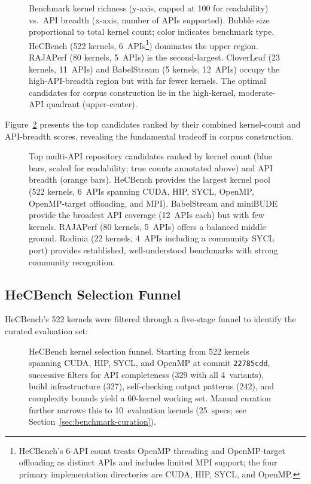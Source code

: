 \begin{figure}[htbp]
    \centering
    
    \caption{Benchmark kernel richness (y-axis, capped at 100 for readability) vs.\
    API breadth (x-axis, number of APIs supported). Bubble size proportional to total kernel count; color indicates benchmark type. HeCBench (522 kernels, 6~APIs\protect\footnote{HeCBench's 6-API count treats OpenMP threading and OpenMP-target offloading as distinct APIs and includes limited MPI support; the four primary implementation directories are CUDA, HIP, SYCL, and OpenMP.}) dominates the upper region. RAJAPerf (80 kernels, 5~APIs) is the second-largest. CloverLeaf (23 kernels, 11~APIs) and BabelStream (5 kernels, 12~APIs) occupy the high-API-breadth region but with far fewer kernels. The optimal candidates for corpus construction lie in the high-kernel, moderate-API quadrant (upper-center).}
  \label{fig:kernel-api-bubble}
\end{figure}

Figure~\ref{fig:top-candidates} presents the top candidates ranked by their combined kernel-count and API-breadth scores, revealing the fundamental tradeoff in corpus construction.

\begin{figure}[htbp]
    \centering
    
    \caption{Top multi-API repository candidates ranked by kernel count (blue bars, scaled for readability; true counts annotated above) and API breadth (orange bars). HeCBench provides the largest kernel pool (522 kernels, 6~APIs spanning CUDA, HIP, SYCL, OpenMP, OpenMP-target offloading, and MPI). BabelStream and miniBUDE provide the broadest API coverage (12~APIs each) but with few kernels. RAJAPerf (80 kernels, 5~APIs) offers a balanced middle ground. Rodinia (22 kernels, 4~APIs including a community SYCL port) provides established, well-understood benchmarks with strong community recognition.}
    \label{fig:top-candidates}
\end{figure}

\subsection{HeCBench Selection Funnel}

HeCBench's 522 kernels were filtered through a five-stage funnel to identify the curated evaluation set:

\begin{figure}[htbp]
  \centering
  
  \caption{HeCBench kernel selection funnel. Starting from 522 kernels spanning
    CUDA, HIP, SYCL, and OpenMP at commit \texttt{22785cdd}, successive filters
    for API completeness (329 with all 4~variants), build infrastructure (327),
    self-checking output patterns (242), and complexity bounds yield a 60-kernel
    working set. Manual curation further narrows this to 10~evaluation kernels
    (25~specs; see Section~\ref{sec:benchmark-curation}).}
  \label{fig:selection-funnel}
\end{figure}

